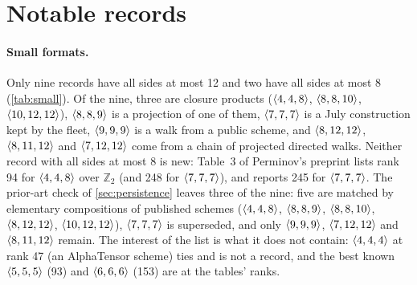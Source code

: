 \section{Notable records}\label{sec:highlights}

\paragraph{Small formats.}
Only nine records have all sides at most 12 and two have all sides at most 8 (\cref{tab:small}). Of the nine, three are closure products ($\langle 4,4,8\rangle$, $\langle 8,8,10\rangle$, $\langle 10,12,12\rangle$), $\langle 8,8,9\rangle$ is a projection of one of them, $\langle 7,7,7\rangle$ is a July construction kept by the fleet, $\langle 9,9,9\rangle$ is a walk from a public scheme, and $\langle 8,12,12\rangle$, $\langle 8,11,12\rangle$ and $\langle 7,12,12\rangle$ come from a chain of projected directed walks.
Neither record with all sides at most 8 is new: Table~3 of Perminov's preprint \cite{perminov2025ternary} lists rank 94 for $\langle 4,4,8\rangle$ over $\mathbb Z_2$ (and 248 for $\langle 7,7,7\rangle$), and \cite{medley2026gpu} reports 245 for $\langle 7,7,7\rangle$.
The prior-art check of \cref{sec:persistence} leaves three of the nine: five are matched by elementary compositions of published schemes ($\langle 4,4,8\rangle$, $\langle 8,8,9\rangle$, $\langle 8,8,10\rangle$, $\langle 8,12,12\rangle$, $\langle 10,12,12\rangle$), $\langle 7,7,7\rangle$ is superseded, and only $\langle 9,9,9\rangle$, $\langle 7,12,12\rangle$ and $\langle 8,11,12\rangle$ remain.
The interest of the list is what it does not contain:
$\langle 4,4,4\rangle$ at rank 47 (an AlphaTensor scheme) ties and is not a record, and the best known $\langle 5,5,5\rangle$ (93) and $\langle 6,6,6\rangle$ (153) \cite{moosbauer2025flip} are at the tables' ranks.
